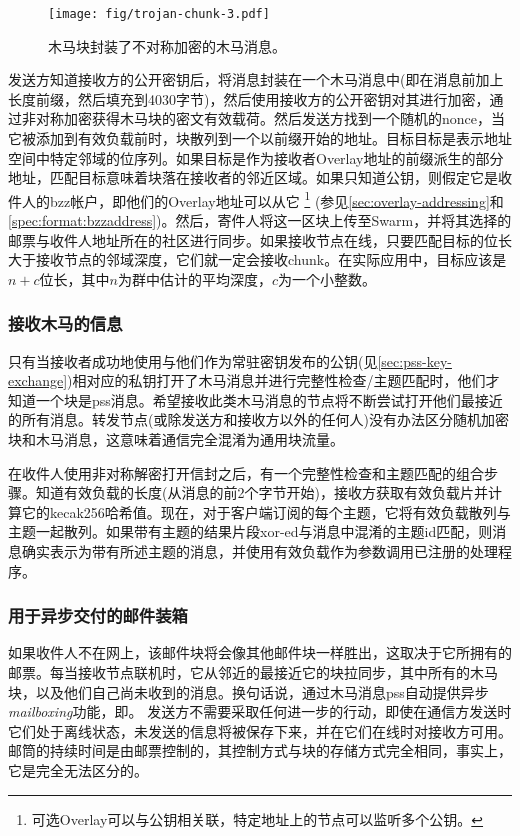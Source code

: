 \begin{figure}[htbp]
\centering
\texttt{[image: fig/trojan-chunk-3.pdf]}
\caption[木马chunk\statusgreen]{木马块封装了不对称加密的木马消息。}
\label{fig:trojan-chunk}
\end{figure}

发送方知道接收方的公开密钥后，将消息封装在一个木马消息中(即在消息前加上长度前缀，然后填充到4030字节)，然后使用接收方的公开密钥对其进行加密，通过非对称加密获得木马块的密文有效载荷。然后发送方找到一个随机的nonce，当它被添加到有效负载前时，块散列到一个以前缀开始的地址。目标目标是表示地址空间中特定邻域的位序列。如果目标是作为接收者Overlay地址的前缀派生的部分地址，匹配目标意味着块落在接收者的邻近区域。如果只知道公钥，则假定它是收件人的bzz帐户，即他们的Overlay地址可以从它%
%
\footnote{可选Overlay可以与公钥相关联，特定地址上的节点可以监听多个公钥。}
%
(参见\ref{sec:overlay-addressing}和\ref{spec:format:bzzaddress})。然后，寄件人将这一区块上传至Swarm，并将其选择的邮票与收件人地址所在的社区进行同步。如果接收节点在线，只要匹配目标的位长大于接收节点的邻域深度，它们就一定会接收chunk。在实际应用中，目标应该是$n+c$位长，其中$n$为群中估计的平均深度，$c$为一个小整数。 

\subsubsection{接收木马的信息}

只有当接收者成功地使用与他们作为常驻密钥发布的公钥(见\ref{sec:pss-key-exchange})相对应的私钥打开了木马消息并进行完整性检查/主题匹配时，他们才知道一个块是pss消息。希望接收此类木马消息的节点将不断尝试打开他们最接近的所有消息。转发节点(或除发送方和接收方以外的任何人)没有办法区分随机加密块和木马消息，这意味着通信完全混淆为通用块流量。

在收件人使用非对称解密打开信封之后，有一个完整性检查和主题匹配的组合步骤。知道有效负载的长度(从消息的前2个字节开始)，接收方获取有效负载片并计算它的kecak256哈希值。现在，对于客户端订阅的每个主题，它将有效负载散列与主题一起散列。如果带有主题的结果片段xor-ed与消息中混淆的主题id匹配，则消息确实表示为带有所述主题的消息，并使用有效负载作为参数调用已注册的处理程序。

\subsubsection{用于异步交付的邮件装箱}

如果收件人不在网上，该邮件块将会像其他邮件块一样胜出，这取决于它所拥有的邮票。每当接收节点联机时，它从邻近的最接近它的块拉同步，其中所有的木马块，以及他们自己尚未收到的消息。换句话说，通过木马消息pss自动提供异步\emph{mailboxing}功能，即。 
发送方不需要采取任何进一步的行动，即使在通信方发送时它们处于离线状态，未发送的信息将被保存下来，并在它们在线时对接收方可用。邮筒的持续时间是由邮票控制的，其控制方式与块的存储方式完全相同，事实上，它是完全无法区分的。

